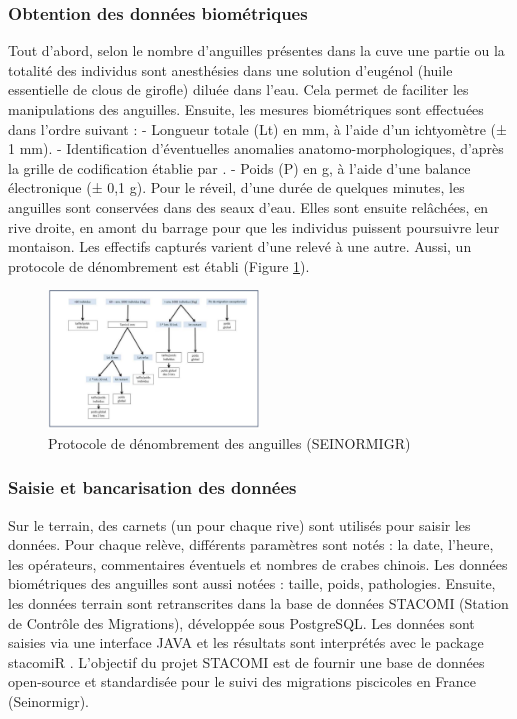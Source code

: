 \documentclass[11pt,titlepage,twoside]{article}\usepackage[]{graphicx}\usepackage[table]{xcolor}
\begin{document}
\subsubsection{Obtention des données biométriques}

Tout d’abord, selon le nombre d’anguilles présentes dans la cuve une partie ou la totalité des individus sont anesthésies dans une solution d’eugénol (huile essentielle de clous de girofle) diluée dans l’eau. Cela permet de faciliter les manipulations des anguilles. Ensuite, les mesures biométriques sont effectuées dans l’ordre suivant : 
-	Longueur totale (Lt) en mm, à l'aide d’un ichtyomètre (± 1 mm). 
-	Identification d’éventuelles anomalies anatomo-morphologiques, d’après la grille de codification établie par \citep{elie_sante_2014}. 
-	 Poids (P) en g, à l'aide d’une balance électronique (± 0,1 g). 
Pour le réveil, d’une durée de quelques minutes, les anguilles sont conservées dans des seaux d’eau. Elles sont ensuite relâchées, en rive droite, en amont du barrage pour que les individus puissent poursuivre leur montaison. Les effectifs capturés varient d’une relevé à une autre. Aussi, un protocole de dénombrement est établi (Figure \ref{Protocole}). 

\begin{figure}[htpb]
\centering
\includegraphics[width=0.5\textwidth]{Protocole}
\caption{Protocole de dénombrement des anguilles (SEINORMIGR)}
\label{Protocole}
\end{figure}


\subsubsection{Saisie et bancarisation des données}

Sur le terrain, des carnets (un pour chaque rive) sont utilisés pour saisir les données. Pour chaque relève, différents paramètres sont notés : la date, l’heure, les opérateurs, commentaires éventuels et nombres de crabes chinois. Les données biométriques des anguilles sont aussi notées : taille, poids, pathologies.
Ensuite, les données terrain sont retranscrites dans la base de données STACOMI (Station de Contrôle des Migrations), développée sous PostgreSQL. Les données sont saisies via une interface JAVA et les résultats sont interprétés avec le package stacomiR \citep{legrand_stacomir_2019}. L’objectif du projet STACOMI est de fournir une base de données open-source et standardisée pour le suivi des migrations piscicoles en France (Seinormigr).
\end{document}

